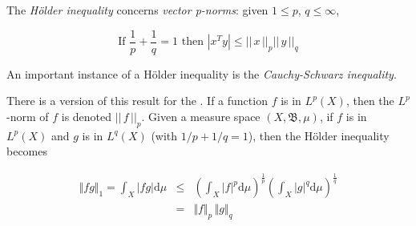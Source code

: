 \documentclass[12pt]{article}
\begin{document}
The \emph{H\"older inequality} concerns \emph{vector p-norms}: given $1 \leq p$, $q \leq \infty$,

\begin{displaymath}
    \mbox{If }\frac{1}{p}+\frac{1}{q}=1\mbox{ then }|x^Ty| \leq ||\,x\,||_p||\,y\,||_q
\end{displaymath}

An important instance of a H\"older inequality is the \emph{Cauchy-Schwarz inequality}.

There is a version of this result for the .
If a function $f$ is in $L^p(X)$, then the $L^p$-norm of $f$ is denoted
$||\,f\,||_p$.
Given a measure space $(X,\mathfrak{B},\mu)$, if $f$ is in $L^p(X)$ and $g$ is in $L^q(X)$ (with $1/p + 1/q = 1$), then
the H\"older inequality becomes

\begin{eqnarray*}
\Vert fg\Vert_1 = \int_X \vert fg\vert \mathrm{d}\mu 
                      & \le & 
\left(\int_X|f|^p\mathrm{d}\mu\right)^{\frac{1}{p}}
\left(\int_X|g|^q\mathrm{d}\mu\right)^{\frac{1}{q}}\\
& = & \Vert f\Vert_p\,\Vert g \Vert_q 
\end{eqnarray*}
\end{document}
